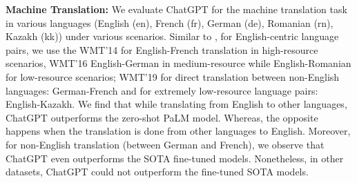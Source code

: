 \documentclass[11pt]{article}
\begin{document}
\textbf{Machine Translation:} We evaluate ChatGPT for the  machine translation task in various languages (English (en), French (fr), German (de), Romanian (rn), Kazakh (kk)) under various scenarios. Similar to \cite{chowdhery2022palm}, for English-centric language pairs, we use the WMT'14 \cite{bojar2014findings} for English-French translation in high-resource scenarios, WMT'16 \cite{bojar2016findings} English-German in medium-resource while English-Romanian for low-resource scenarios; WMT'19 \cite{barrault2019findings} for direct translation between non-English languages: German-French and for extremely low-resource language pairs: English-Kazakh. We find that while translating from English to other languages, ChatGPT outperforms the zero-shot PaLM model. Whereas, the opposite happens when the translation is done from other languages to English. Moreover, for non-English translation (between German and French), we observe that ChatGPT even outperforms the SOTA fine-tuned models. Nonetheless, in other datasets, ChatGPT could not outperform the fine-tuned SOTA models. 
\end{document}
